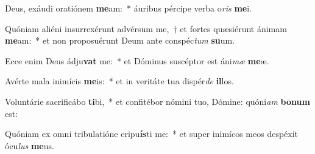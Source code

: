 \item Deus, exáudi oratiónem \textbf{me}am:~* áuribus pércipe verba o\textit{ris} \textbf{me}i.
\item Quóniam aliéni insurrexérunt advérsum me,~† et fortes quæsiérunt ánimam \textbf{me}am:~* et non proposuérunt Deum ante conspéc\textit{tum} \textbf{su}um.
\item Ecce enim Deus ádju\textbf{vat} me:~* et Dóminus suscéptor est áni\textit{mæ} \textbf{me}æ.
\item Avérte mala inimícis \textbf{me}is:~* et in veritáte tua dispér\textit{de} \textbf{il}los.
\item Voluntárie sacrificábo \textbf{ti}bi,~* et confitébor nómini tuo, Dómine: quóni\textit{am} \textbf{bo}\textbf{num} est:
\item Quóniam ex omni tribulatióne eripu\textbf{ís}ti me:~* et super inimícos meos despéxit ócu\textit{lus} \textbf{me}us.
